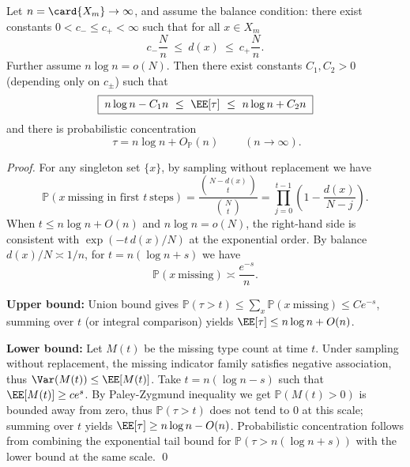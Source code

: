 \begin{theorem}\label{thm:pom-microcanonical-cover-time-nlogn-scale}
Let \(n=\card{X_m}\to\infty\), and assume the balance condition: there exist constants \(0<c_-\le c_+<\infty\) such that for all \(x\in X_m\)
\[
c_-\frac{N}{n}\ \le\ d(x)\ \le\ c_+\frac{N}{n}.
\]
Further assume \(n\log n=o(N)\).
Then there exist constants \(C_1,C_2>0\) (depending only on \(c_\pm\)) such that
\[
\boxed{\;
n\log n-C_1n\ \le\ \EE[\tau]\ \le\ n\log n+C_2n\;}
\]
and there is probabilistic concentration
\[
\boxed{\;
\tau=n\log n+O_{\mathbb{P}}(n)\;}
\qquad(n\to\infty).
\]
\end{theorem}
\begin{proof}
For any singleton set \(\{x\}\), by sampling without replacement we have
\[
\mathbb{P}(x\ \text{missing in first }t\ \text{steps})
=\frac{\binom{N-d(x)}{t}}{\binom{N}{t}}
=\prod_{j=0}^{t-1}\left(1-\frac{d(x)}{N-j}\right).
\]
When \(t\le n\log n+O(n)\) and \(n\log n=o(N)\), the right-hand side is consistent with
\(\exp(-t\,d(x)/N)\) at the exponential order.
By balance \(d(x)/N\asymp 1/n\), for \(t=n(\log n+s)\) we have
\[
\mathbb{P}(x\ \text{missing})\asymp \frac{e^{-s}}{n}.
\]
\par
\textbf{Upper bound:} Union bound gives \(\mathbb{P}(\tau>t)\le\sum_{x}\mathbb{P}(x\ \text{missing})\le C e^{-s}\),
summing over \(t\) (or integral comparison) yields \(\EE[\tau]\le n\log n+O(n)\).
\par
\textbf{Lower bound:} Let \(M(t)\) be the missing type count at time \(t\).
Under sampling without replacement, the missing indicator family satisfies negative association, thus \(\Var(M(t))\le \EE[M(t)]\).
Take \(t=n(\log n-s)\) such that \(\EE[M(t)]\ge c e^{s}\).
By Paley-Zygmund inequality we get \(\mathbb{P}(M(t)>0)\) is bounded away from zero,
thus \(\mathbb{P}(\tau>t)\) does not tend to \(0\) at this scale;
summing over \(t\) yields \(\EE[\tau]\ge n\log n-O(n)\).
Probabilistic concentration follows from combining the exponential tail bound for \(\mathbb{P}(\tau>n(\log n+s))\) with the lower bound at the same scale. \qed
\end{proof}

